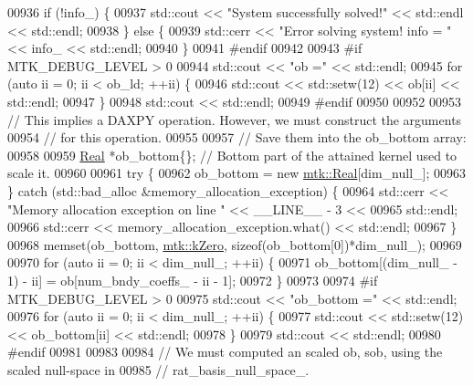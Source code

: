 \begin{DoxyCode}
{{00936     \textcolor{keywordflow}{if} (!info\_) \{
00937       std::cout << \textcolor{stringliteral}{"System successfully solved!"} << std::endl << std::endl;
00938     \} \textcolor{keywordflow}{else} \{
00939       std::cerr << \textcolor{stringliteral}{"Error solving system! info = "} << info\_ << std::endl;
00940     \}
00941 \textcolor{preprocessor}{    #endif}
00942 
00943 \textcolor{preprocessor}{    #if MTK\_DEBUG\_LEVEL > 0}
00944     std::cout << \textcolor{stringliteral}{"ob ="} << std::endl;
00945     \textcolor{keywordflow}{for} (\textcolor{keyword}{auto} ii = 0; ii < ob\_ld; ++ii) \{
00946       std::cout << std::setw(12) << ob[ii] << std::endl;
00947     \}
00948     std::cout << std::endl;
00949 \textcolor{preprocessor}{    #endif}
00950 
00952 
00953     \textcolor{comment}{// This implies a DAXPY operation. However, we must construct the arguments}
00954     \textcolor{comment}{// for this operation.}
00955 
00957     \textcolor{comment}{// Save them into the ob\_bottom array:}
00958 
00959     \hyperlink{group__c01-roots_gac080bbbf5cbb5502c9f00405f894857d}{Real} *ob\_bottom\{\}; \textcolor{comment}{// Bottom part of the attained kernel used to scale it.}
00960 
00961     \textcolor{keywordflow}{try} \{
00962       ob\_bottom = \textcolor{keyword}{new} \hyperlink{group__c01-roots_gac080bbbf5cbb5502c9f00405f894857d}{mtk::Real}[dim\_null\_];
00963     \} \textcolor{keywordflow}{catch} (std::bad\_alloc &memory\_allocation\_exception) \{
00964       std::cerr << \textcolor{stringliteral}{"Memory allocation exception on line "} << \_\_LINE\_\_ - 3 <<
00965         std::endl;
00966       std::cerr << memory\_allocation\_exception.what() << std::endl;
00967     \}
00968     memset(ob\_bottom, \hyperlink{group__c01-roots_ga59a451a5fae30d59649bcda274fea271}{mtk::kZero}, \textcolor{keyword}{sizeof}(ob\_bottom[0])*dim\_null\_);
00969 
00970     \textcolor{keywordflow}{for} (\textcolor{keyword}{auto} ii = 0; ii < dim\_null\_; ++ii) \{
00971       ob\_bottom[(dim\_null\_ - 1) - ii] = ob[num\_bndy\_coeffs\_ - ii - 1];
00972     \}
00973 
00974 \textcolor{preprocessor}{    #if MTK\_DEBUG\_LEVEL > 0}
00975     std::cout << \textcolor{stringliteral}{"ob\_bottom ="} << std::endl;
00976     \textcolor{keywordflow}{for} (\textcolor{keyword}{auto} ii = 0; ii < dim\_null\_; ++ii) \{
00977       std::cout << std::setw(12) << ob\_bottom[ii] << std::endl;
00978     \}
00979     std::cout << std::endl;
00980 \textcolor{preprocessor}{    #endif}
00981 
00983 
00984     \textcolor{comment}{// We must computed an scaled ob, sob, using the scaled null-space in}
00985     \textcolor{comment}{// rat\_basis\_null\_space\_.}
}}
\end{DoxyCode}
